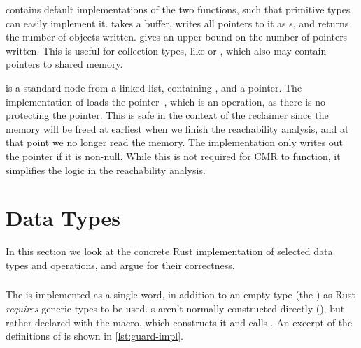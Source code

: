 \begin{figure}[ht]
  
\end{figure}

 contains default implementations of the two functions, such that primitive types can
easily implement it.  takes a buffer, writes all pointers to it as s,
and returns the number of objects written.  gives an upper bound on the number of
pointers written. This is useful for collection types, like  or , which
also may contain pointers to shared memory.

 is a standard node from a linked list, containing , and a 
pointer. The implementation of  loads the  pointer~, which is
an  operation, as there is no  protecting the pointer. This is safe in the
context of the reclaimer since the memory will be freed at earliest when we finish the reachability
analysis, and at that point we no longer read the memory. The implementation only writes out the
pointer if it is non-null. While this is not required for CMR to function, it simplifies the logic
in the reachability analysis.


\section{Data Types\label{sec:data-types}}

In this section we look at the concrete Rust implementation of selected data types and operations,
and argue for their correctness.


\subsubsection{}

The  is implemented as a single word, in addition to an empty type (the
) as Rust \emph{requires} generic types to be used. s aren't normally
constructed directly (), but rather declared with the
 macro, which constructs it and calls .
An excerpt of the definitions of  is shown in \cref{lst:guard-impl}.
\begin{figure}[t]
  
\end{figure}


